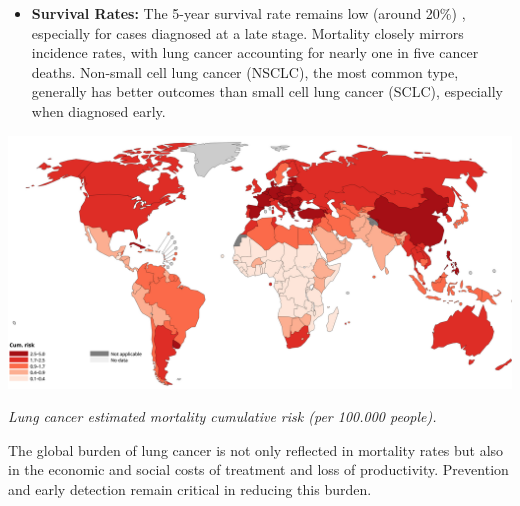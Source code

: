 \begin{itemize}
    \item \textbf{Survival Rates:} The 5-year survival rate remains low (around 20\%) 
    \cite{nlm2025}, especially for cases diagnosed at a late stage. Mortality closely mirrors 
    incidence rates, with lung cancer accounting for nearly one in five cancer deaths. Non-small 
    cell lung cancer (NSCLC), the most common type, generally has better outcomes than small cell 
    lung cancer (SCLC), especially when diagnosed early.
\end{itemize}

\vspace{1em}
\begin{center}
    \includegraphics[width=1.00\textwidth]{../assets/01-overview/lc-cumulative-risk.png}

    \small\textit{Lung cancer estimated mortality cumulative risk (per 100.000 people). 
    \cite{who2024}}
\end{center}
\vspace{1em}

The global burden of lung cancer is not only reflected in mortality rates but also in the economic 
and social costs of treatment and loss of productivity. Prevention and early detection remain 
critical in reducing this burden.

